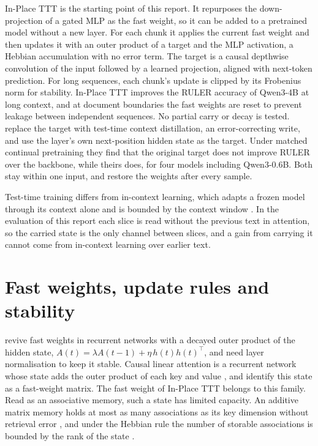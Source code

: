 \documentclass[12pt,a4paper]{report}
\begin{document}
In-Place TTT \citep{feng2026inplace} is the starting point of this report. It repurposes the down-projection of a gated MLP as the fast weight, so it can be added to a pretrained model without a new layer. For each chunk it applies the current fast weight and then updates it with an outer product of a target and the MLP activation, a Hebbian accumulation with no error term. The target is a causal depthwise convolution of the input followed by a learned projection, aligned with next-token prediction. For long sequences, each chunk's update is clipped by its Frobenius norm for stability. In-Place TTT improves the RULER accuracy of Qwen3-4B at long context, and at document boundaries the fast weights are reset to prevent leakage between independent sequences. No partial carry or decay is tested. \citet{wang2026learning} replace the target with test-time context distillation, an error-correcting write, and \citet{ouyang2026ttt} use the layer's own next-position hidden state as the target. Under matched continual pretraining they find that the original target does not improve RULER over the backbone, while theirs does, for four models including Qwen3-0.6B. Both stay within one input, and \citet{ouyang2026ttt} restore the weights after every sample.

Test-time training differs from in-context learning, which adapts a frozen model through its context alone and is bounded by the context window \citep{brown2020language,dong2024survey}. In the evaluation of this report each slice is read without the previous text in attention, so the carried state is the only channel between slices, and a gain from carrying it cannot come from in-context learning over earlier text.

\section{Fast weights, update rules and stability}
\label{sec-lit-fw}

\citet{ba2016using} revive fast weights in recurrent networks with a decayed outer product of the hidden state, $A(t) = \lambda A(t-1) + \eta\, h(t) h(t)^\top$, and need layer normalisation to keep it stable. Causal linear attention is a recurrent network whose state adds the outer product of each key and value \citep{katharopoulos2020transformers}, and \citet{schlag2021linear} identify this state as a fast-weight matrix. The fast weight of In-Place TTT belongs to this family. Read as an associative memory, such a state has limited capacity. An additive matrix memory holds at most as many associations as its key dimension without retrieval error \citep{schlag2021linear}, and under the Hebbian rule the number of storable associations is bounded by the rank of the state \citep{mcdermott2026lifelong}.
\end{document}
